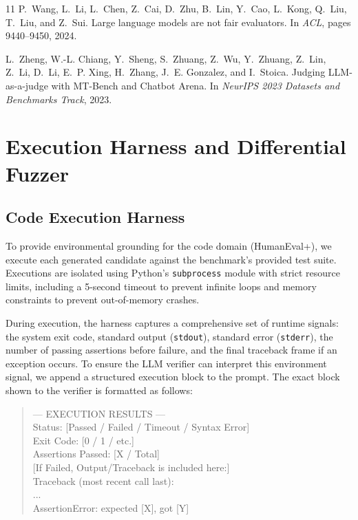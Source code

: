 \documentclass{article}
\begin{document}
\begin{thebibliography}{11}
P.~Wang, L.~Li, L.~Chen, Z.~Cai, D.~Zhu, B.~Lin, Y.~Cao, L.~Kong, Q.~Liu, T.~Liu,
  and Z.~Sui.
\newblock Large language models are not fair evaluators.
\newblock In \emph{ACL}, pages 9440--9450, 2024.

L.~Zheng, W.-L. Chiang, Y.~Sheng, S.~Zhuang, Z.~Wu, Y.~Zhuang, Z.~Lin, Z.~Li, D.~Li,
  E.~P. Xing, H.~Zhang, J.~E. Gonzalez, and I.~Stoica.
\newblock Judging {LLM}-as-a-judge with {MT-Bench} and {C}hatbot {A}rena.
\newblock In \emph{NeurIPS 2023 Datasets and Benchmarks Track}, 2023.

\end{thebibliography}
\appendix
\section{Execution Harness and Differential Fuzzer}
\label{app:execution}

\subsection{Code Execution Harness}
To provide environmental grounding for the code domain (HumanEval+), we execute each generated candidate against the benchmark's provided test suite. Executions are isolated using Python's \texttt{subprocess} module with strict resource limits, including a 5-second timeout to prevent infinite loops and memory constraints to prevent out-of-memory crashes. 

During execution, the harness captures a comprehensive set of runtime signals: the system exit code, standard output (\texttt{stdout}), standard error (\texttt{stderr}), the number of passing assertions before failure, and the final traceback frame if an exception occurs. To ensure the LLM verifier can interpret this environment signal, we append a structured execution block to the prompt. The exact block shown to the verifier is formatted as follows:

\begin{quote}
\small\ttfamily
--- EXECUTION RESULTS ---\\
Status: [Passed / Failed / Timeout / Syntax Error]\\
Exit Code: [0 / 1 / etc.]\\
Assertions Passed: [X / Total]\\[4pt]
{[}If Failed, Output/Traceback is included here:{]}\\
Traceback (most recent call last):\\
...\\
AssertionError: expected [X], got [Y]
\end{quote}
\end{document}
